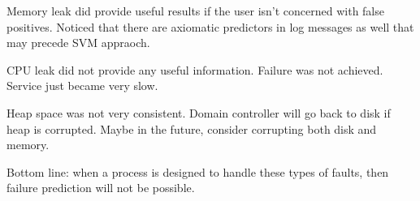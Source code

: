 Memory leak did provide useful results if the user isn't concerned with false
positives.  Noticed that there are axiomatic predictors in log messages as well
that may precede SVM appraoch.

CPU leak did not provide any useful information.  Failure was not achieved.
Service just became very slow.

Heap space was not very consistent.  Domain controller will go back to disk if
heap is corrupted.  Maybe in the future, consider corrupting both disk and
memory.

Bottom line: when a process is designed to handle these types of faults, then
failure prediction will not be possible.



